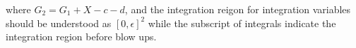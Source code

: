 \documentclass[12pt]{article}
\theoremstyle{definition}
\theoremstyle{plain}
\begin{document}
where $G_{2}=G_{1}+X-c-d$, and the integration reigon for integration variables should be understood as $[0,\epsilon]^{2}$ while the subscript of integrals indicate the integration region before blow ups.














\end{document}

